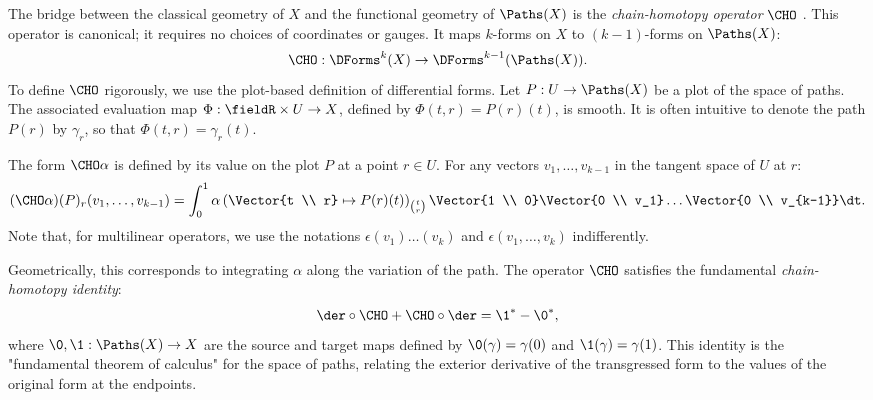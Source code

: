 \begin{article}
  \label{subsec:The Chain-Homotopy Operator}
  The bridge between the classical geometry of $X$ and the functional geometry of $\Paths(X)$ is the \emph{chain-homotopy operator} $\CHO$ \cite{PIZ13}.
  This operator is canonical;
  it requires no choices of coordinates or gauges.
  It maps $k$-forms on $X$ to $(k-1)$-forms on $\Paths(X)$:
  \[
    \CHO : \DForms^k(X) \to \DForms^{k-1}(\Paths(X)).
    \]
  To define $\CHO$ rigorously,
  we use the plot-based definition of differential forms.
  Let $P: U \to \Paths(X)$ be a plot of the space of paths.
  The associated evaluation map $\Phi: \fieldR \times U \to X$,
  defined by $\Phi(t,r) = P(r)(t)$,
  is smooth.
  It is often intuitive to denote the path $P(r)$ by $\gamma_r$,
  so that $\Phi(t,r) = \gamma_r(t)$.
  
  The form $\CHO\alpha$ is defined by its value on the plot $P$ at a point $r \in U$.
  For any vectors $v_1, \dots, v_{k-1}$ in the tangent space of $U$ at $r$:
  \[
    (\CHO\alpha)(P)_r(v_1, \dots, v_{k-1}) = \int_0^1 \alpha\left(\Vector{t \\ r} \mapsto P(r)(t) \right)_{t \choose r}\Vector{1 \\ 0} \Vector{0 \\ v_1} \dots \Vector{0 \\ v_{k-1}} \dt.
    \]
  Note that,
  for multilinear operators,
  we use the notations $\epsilon(v_1)\dots(v_k)$ and $\epsilon(v_1,\dots,v_k)$ indifferently.
  
  Geometrically,
  this corresponds to integrating $\alpha$ along the variation of the path.
  The operator $\CHO$ satisfies the fundamental \emph{chain-homotopy identity}:
  \[
    \der \circ \CHO + \CHO \circ \der = \1^* - \0^*,
    \]
  where $\0, \1: \Paths(X) \to X$ are the source and target maps defined by $\0(\gamma) = \gamma(0)$ and $\1(\gamma) = \gamma(1)$.
  This identity is the "fundamental theorem of calculus" for the space of paths,
  relating the exterior derivative of the transgressed form to the values of the original form at the endpoints.
  

\end{article}
